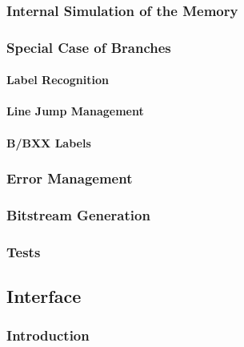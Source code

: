 \documentclass{article}
\begin{document}
\subsubsection{Internal Simulation of the Memory}
\subsubsection{Special Case of Branches}
\paragraph{Label Recognition}
\paragraph{Line Jump Management}
\paragraph{B/BXX Labels}
\subsubsection{Error Management}
\subsubsection{Bitstream Generation}

\subsubsection{Tests}

\paragraph{}













\newpage
\subsection{Interface}
\paragraph{}
\subsubsection{Introduction}
\end{document}
